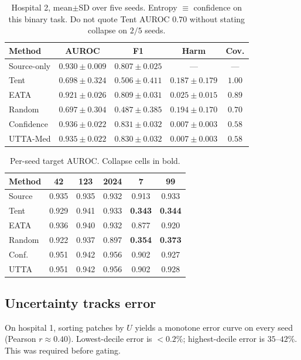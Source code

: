 \documentclass[conference]{IEEEtran}
\begin{document}
\begin{table}[t]
\caption{Hospital 2, mean$\pm$SD over five seeds.
Entropy $\equiv$ confidence on this binary task.
Do not quote Tent AUROC $0.70$ without stating collapse on $2/5$ seeds.}
\label{tab:main}
\centering
\scriptsize
\begin{tabular}{lcccc}
\toprule
Method & AUROC & F1 & Harm & Cov. \\
\midrule
Source-only & $0.930{\pm}0.009$ & $0.807{\pm}0.025$ & --- & --- \\
Tent        & $0.698{\pm}0.324$ & $0.506{\pm}0.411$ & $0.187{\pm}0.179$ & $1.00$ \\
EATA        & $0.921{\pm}0.026$ & $0.809{\pm}0.031$ & $0.025{\pm}0.015$ & $0.89$ \\
Random      & $0.697{\pm}0.304$ & $0.487{\pm}0.385$ & $0.194{\pm}0.170$ & $0.70$ \\
Confidence  & $\mathbf{0.936}{\pm}0.022$ & $\mathbf{0.831}{\pm}0.032$ & $\mathbf{0.007}{\pm}0.003$ & $0.58$ \\
UTTA-Med    & $0.935{\pm}0.022$ & $0.830{\pm}0.032$ & $\mathbf{0.007}{\pm}0.003$ & $0.58$ \\
\bottomrule
\end{tabular}
\end{table}

\begin{table}[t]
\caption{Per-seed target AUROC. Collapse cells in bold.}
\label{tab:perseed}
\centering
\scriptsize
\begin{tabular}{lccccc}
\toprule
Method & 42 & 123 & 2024 & 7 & 99 \\
\midrule
Source & 0.935 & 0.935 & 0.932 & 0.913 & 0.933 \\
Tent   & 0.929 & 0.941 & 0.933 & \textbf{0.343} & \textbf{0.344} \\
EATA   & 0.936 & 0.940 & 0.932 & 0.877 & 0.920 \\
Random & 0.922 & 0.937 & 0.897 & \textbf{0.354} & \textbf{0.373} \\
Conf.  & 0.951 & 0.942 & 0.956 & 0.902 & 0.927 \\
UTTA   & 0.951 & 0.942 & 0.956 & 0.902 & 0.928 \\
\bottomrule
\end{tabular}
\end{table}

\subsection{Uncertainty tracks error}
On hospital 1, sorting patches by $U$ yields a monotone error curve on every seed (Pearson $r{\approx}0.40$).
Lowest-decile error is ${<}0.2\%$; highest-decile error is $35$--$42\%$.
This was required before gating.
\end{document}

